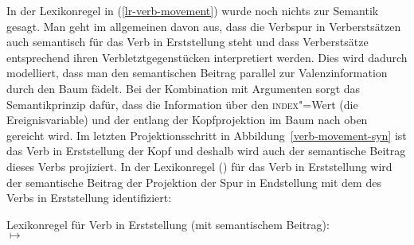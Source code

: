 In der Lexikonregel in (\ref{lr-verb-movement}) wurde noch nichts zur Semantik gesagt. Man geht im allgemeinen davon aus, dass
die Verbspur in Verberstsätzen auch semantisch für das Verb in Erststellung steht und
dass Verberstsätze entsprechend ihren Verbletztgegenstücken interpretiert werden. Dies
wird dadurch modelliert, dass man den semantischen Beitrag parallel zur Valenzinformation
durch den Baum fädelt. 
Bei der Kombination mit Argumenten sorgt das Semantikprinzip dafür, 
dass die Information über den \textsc{index}"=Wert (die Ereignisvariable) und der \ltopw entlang der Kopfprojektion im Baum nach
oben gereicht wird. Im letzten Projektionsschritt in Abbildung~\ref{verb-movement-syn}
ist das Verb in Erststellung der Kopf und deshalb wird auch der semantische Beitrag
dieses Verbs projiziert. In der Lexikonregel () für das Verb in Erststellung wird
der semantische Beitrag der Projektion der Spur in Endstellung  mit
dem \hookw des Verbs in Erststellung identifiziert:

\eas
\label{lr-verb-movement2}%
Lexikonregel für Verb in Erststellung (mit semantischem Beitrag):\\
 $\mapsto$\\
\flushright{}
\zs
\medskip

